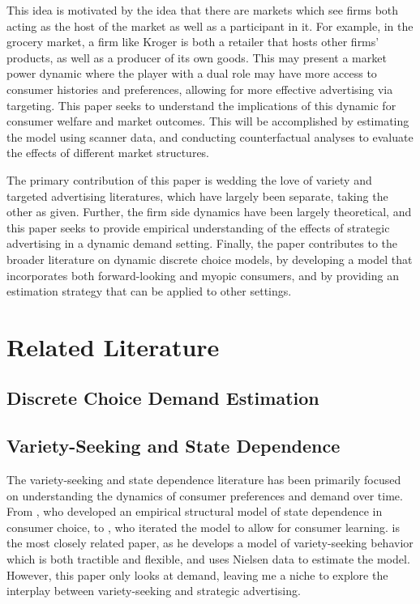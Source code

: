 \documentclass[12pt]{article}
\begin{document}
This idea is motivated by the idea that there are markets which see firms both acting as the host of the market as well as a participant in it. For example, in the grocery market, a firm like Kroger is both a retailer that hosts other firms' products, as well as a producer of its own goods. This may present a market power dynamic where the player with a dual role may have more access to consumer histories and preferences, allowing for more effective advertising via targeting. This paper seeks to understand the implications of this dynamic for consumer welfare and market outcomes. This will be accomplished by estimating the model using scanner data, and conducting counterfactual analyses to evaluate the effects of different market structures.

The primary contribution of this paper is wedding the love of variety and targeted advertising literatures, which have largely been separate, taking the other as given. Further, the firm side dynamics have been largely theoretical, and this paper seeks to provide empirical understanding of the effects of strategic advertising in a dynamic demand setting. Finally, the paper contributes to the broader literature on dynamic discrete choice models, by developing a model that incorporates both forward-looking and myopic consumers, and by providing an estimation strategy that can be applied to other settings.

\section{Related Literature}

    \subsection{Discrete Choice Demand Estimation}

    \subsection{Variety-Seeking and State Dependence}
    The variety-seeking and state dependence literature has been primarily focused on understanding the dynamics of consumer preferences and demand over time. From \cite{lattin_model_1987}, who developed an empirical structural model of state dependence in consumer choice, to \citet{erdem_decision-making_1996}, who iterated the model to allow for consumer learning. \cite{chintagunta_variety_1999} is the most closely related paper, as he develops a model of variety-seeking behavior which is both tractible and flexible, and uses Nielsen data to estimate the model. However, this paper only looks at demand, leaving me a niche to explore the interplay between variety-seeking and strategic advertising.
\end{document}
